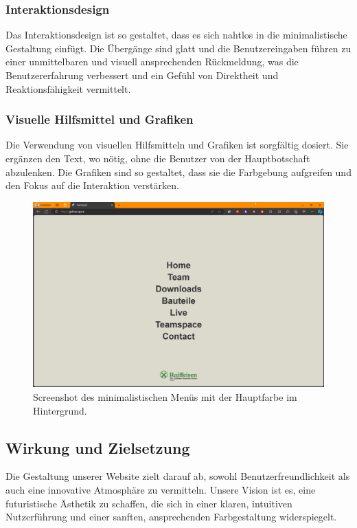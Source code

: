 \subsubsection{Interaktionsdesign}
Das Interaktionsdesign ist so gestaltet, dass es sich nahtlos in die minimalistische Gestaltung einfügt. Die Übergänge sind glatt und die Benutzereingaben führen zu einer unmittelbaren und visuell ansprechenden Rückmeldung, was die Benutzererfahrung verbessert und ein Gefühl von Direktheit und Reaktionsfähigkeit vermittelt.

\subsubsection{Visuelle Hilfsmittel und Grafiken}
Die Verwendung von visuellen Hilfsmitteln und Grafiken ist sorgfältig dosiert. Sie ergänzen den Text, wo nötig, ohne die Benutzer von der Hauptbotschaft abzulenken. Die Grafiken sind so gestaltet, dass sie die Farbgebung aufgreifen und den Fokus auf die Interaktion verstärken.

\begin{figure}[h]
    \centering
    \includegraphics[width=\linewidth]{Resources/menu_screenshot.png}
    \caption{Screenshot des minimalistischen Menüs mit der Hauptfarbe im Hintergrund.}
    \end{figure}

\subsection{Wirkung und Zielsetzung}

Die Gestaltung unserer Website zielt darauf ab, sowohl Benutzerfreundlichkeit als auch eine innovative Atmosphäre zu vermitteln. Unsere Vision ist es, eine futuristische Ästhetik zu schaffen, die sich in einer klaren, intuitiven Nutzerführung und einer sanften, ansprechenden Farbgestaltung widerspiegelt.

